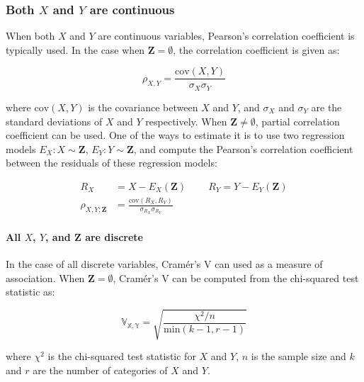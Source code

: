 \documentclass{uai2025} %
\begin{document}

\subsubsection{Both $ X $ and $ Y $ are continuous}
When both $ X $ and $ Y $ are continuous variables, Pearson's correlation
coefficient is typically used. In the case when $ \bm{Z} = \emptyset $, the
correlation coefficient is given as:

\begin{equation}
\rho_{X, Y} = \frac{\mathrm{cov}(X, Y)}{\sigma_X \sigma_Y}
\end{equation}

where $ \mathrm{cov}(X, Y) $ is the covariance between $ X $ and $ Y $, and $
\sigma_X $ and $ \sigma_Y $ are the standard deviations of $ X $ and $ Y $
respectively. When $ \bm{Z} \neq \emptyset $, partial correlation coefficient
can be used. One of the ways to estimate it is to use two regression
models $ E_X: X \sim \bm{Z} $, $ E_Y: Y \sim \bm{Z} $, and compute the Pearson's 
correlation coefficient between the residuals of these regression models: 

\begin{equation}
	\begin{split}
		R_X &= X - E_X(\bm{Z})  \;\;\;\;\;\;\;\;  R_Y = Y - E_Y(\bm{Z}) \\
		\rho_{X, Y; \bm{Z}} &= \frac{\mathrm{cov}(R_X, R_Y)}{\sigma_{R_X} \sigma_{R_Y}}
	\end{split}
\end{equation}

\paragraph{All $ X $, $ Y $, and $ \bm{Z} $ are discrete}

In the case of all discrete variables, Cram\'er's V can used as a measure of
association. When $ \bm{Z} = \emptyset $, Cram\'er's V can be computed from the 
chi-squared test statistic as:

\begin{equation}
	\mathbb{V_{X, Y}} = \sqrt{\frac{\chi^2 / n}{\mathrm{min}(k-1, r-1)}}
\end{equation}

where $ \chi^2 $ is the chi-squared test statistic for $ X $ and $ Y $, $ n $ 
is the sample size and $ k $ and $ r $ are the number of categories of $ X $ and 
$ Y $.
\end{document}
